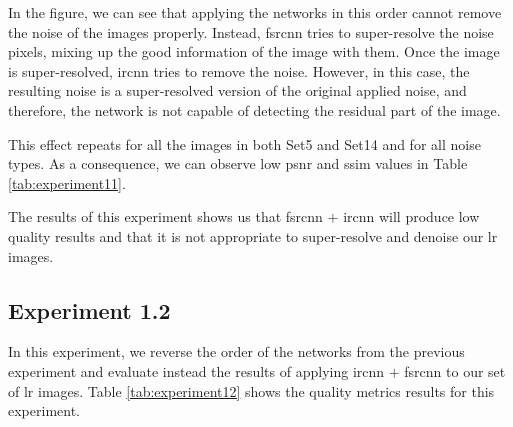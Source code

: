 In the figure, we can see that applying the networks in this order cannot remove the noise of the images properly. Instead, \gls{fsrcnn} tries to super-resolve the noise pixels, mixing up the good information of the image with them. Once the image is super-resolved, \gls{ircnn} tries to remove the noise. However, in this case, the resulting noise is a super-resolved version of the original applied noise, and therefore, the network is not capable of detecting the residual part of the image.

This effect repeats for all the images in both Set5 and Set14 and for all noise types. As a consequence, we can observe low \gls{psnr} and \gls{ssim} values in Table \ref{tab:experiment11}.

The results of this experiment shows us that \gls{fsrcnn} $+$ \gls{ircnn} will produce low quality results and that it is not appropriate to super-resolve and denoise our \gls{lr} images.

\newpage\subsection{Experiment 1.2}
In this experiment, we reverse the order of the networks from the previous experiment and evaluate instead the results of applying \gls{ircnn} $+$ \gls{fsrcnn} to our set of \gls{lr} images. Table \ref{tab:experiment12} shows the quality metrics results for this experiment. 

